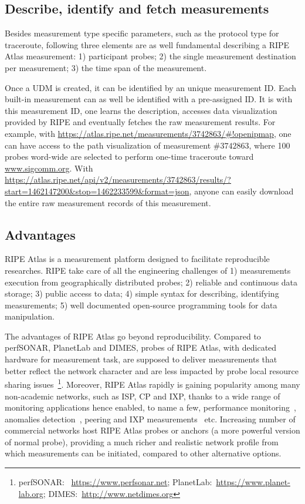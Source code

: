 \subsection{Describe, identify and fetch measurements}
Besides measurement type specific parameters, such as the protocol type for traceroute, following three elements are as well fundamental describing a RIPE Atlas measurement: 1) participant probes; 2) the single measurement destination per measurement; 3) the time span of the measurement. 

Once a \ac{UDM} is created, it can be identified by an unique measurement ID. 
Each built-in measurement can as well be identified with a pre-assigned ID.
It is with this measurement ID, one learns the description, accesses data visualization provided by RIPE and eventually fetches the raw measurement results.
For example, with \url{https://atlas.ripe.net/measurements/3742863/#!openipmap}, one can have access to the path visualization of measurement $\#3742863$, where 100 probes word-wide are selected to perform one-time traceroute toward \url{www.sigcomm.org}. With \url{https://atlas.ripe.net/api/v2/measurements/3742863/results/?start=1462147200&stop=1462233599&format=json}, anyone can easily download the entire raw measurement records of this measurement.

\subsection{Advantages}
RIPE Atlas is a measurement platform designed to facilitate reproducible researches. RIPE take care of all the engineering challenges of 1) measurements execution from geographically distributed probes; 2) reliable and continuous data storage; 3) public access to data; 4) simple syntax for describing, identifying measurements; 5) well documented open-source programming tools for data manipulation.

The advantages of RIPE Atlas go beyond reproducibility. Compared to perfSONAR, PlanetLab and DIMES, probes of RIPE Atlas, with dedicated hardware for measurement task, are supposed to deliver measurements that better reflect the network character and are less impacted by probe local resource sharing issues~\footnote{perfSONAR: ~\url{https://www.perfsonar.net}; PlanetLab:~\url{https://www.planet-lab.org}; DIMES:~\url{http://www.netdimes.org}}.
Moreover, RIPE Atlas rapidly is gaining popularity among many non-academic networks, such as \ac{ISP}, \ac{CP} and \ac{IXP}, thanks to a wide range of monitoring applications hence enabled, to name a few, performance monitoring~\cite{latencymon, Rimondini2014}, anomalies detection~\cite{Fontugne2016, Padmanabhan, halo}, peering and IXP measurements~\cite{ixp, routeixp} etc. Increasing number of commercial networks host RIPE Atlas probes or anchors (a more powerful version of normal probe),   providing a much richer and realistic network profile from which measurements can be initiated, compared to other alternative options.

